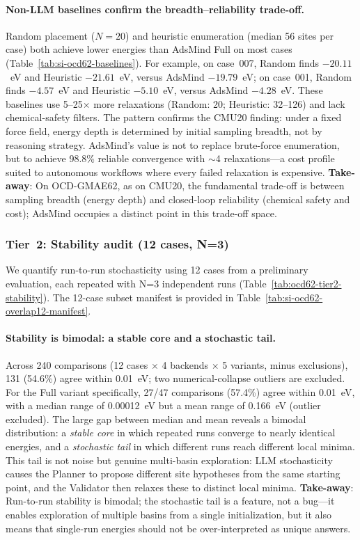 \paragraph{Non-LLM baselines confirm the breadth--reliability trade-off.}
Random placement ($N=20$) and heuristic enumeration (median 56 sites per case) both achieve lower energies than AdsMind Full on most cases (Table~\ref{tab:si-ocd62-baselines}).
For example, on case~007, Random finds $-20.11$~eV and Heuristic $-21.61$~eV, versus AdsMind $-19.79$~eV; on case~001, Random finds $-4.57$~eV and Heuristic $-5.10$~eV, versus AdsMind $-4.28$~eV.
These baselines use 5--25$\times$ more relaxations (Random: 20; Heuristic: 32--126) and lack chemical-safety filters.
The pattern confirms the CMU20 finding: under a fixed force field, energy depth is determined by initial sampling breadth, not by reasoning strategy.
AdsMind's value is not to replace brute-force enumeration, but to achieve 98.8\% reliable convergence with $\sim$4 relaxations---a cost profile suited to autonomous workflows where every failed relaxation is expensive.
\textbf{Take-away}: On OCD-GMAE62, as on CMU20, the fundamental trade-off is between sampling breadth (energy depth) and closed-loop reliability (chemical safety and cost); AdsMind occupies a distinct point in this trade-off space.

\subsubsection{Tier~2: Stability audit (12 cases, N=3)}

We quantify run-to-run stochasticity using 12 cases from a preliminary evaluation, each repeated with N=3 independent runs (Table~\ref{tab:ocd62-tier2-stability}).
The 12-case subset manifest is provided in Table~\ref{tab:si-ocd62-overlap12-manifest}.

\paragraph{Stability is bimodal: a stable core and a stochastic tail.}
Across 240 comparisons (12 cases $\times$ 4 backends $\times$ 5 variants, minus exclusions), 131 (54.6\%) agree within 0.01~eV; two numerical-collapse outliers are excluded.
For the Full variant specifically, 27/47 comparisons (57.4\%) agree within 0.01~eV, with a median range of 0.00012~eV but a mean range of 0.166~eV (outlier excluded).
The large gap between median and mean reveals a bimodal distribution: a \emph{stable core} in which repeated runs converge to nearly identical energies, and a \emph{stochastic tail} in which different runs reach different local minima.
This tail is not noise but genuine multi-basin exploration: LLM stochasticity causes the Planner to propose different site hypotheses from the same starting point, and the Validator then relaxes these to distinct local minima.
\textbf{Take-away}: Run-to-run stability is bimodal; the stochastic tail is a feature, not a bug---it enables exploration of multiple basins from a single initialization, but it also means that single-run energies should not be over-interpreted as unique answers.

